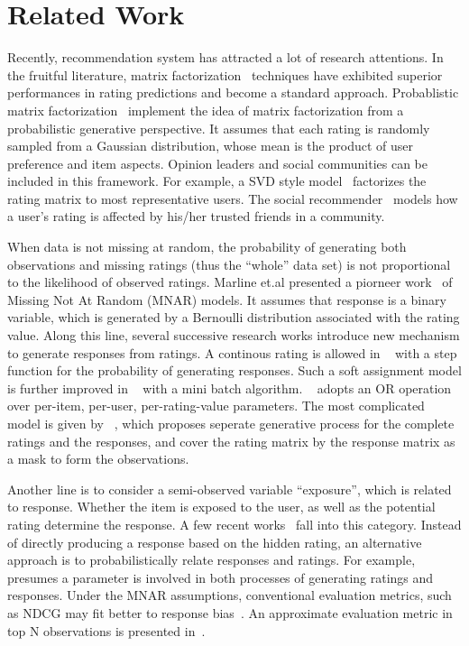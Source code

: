 \documentclass{sig-alternate}
\begin{document}
\section{Related Work}\label{sec:related}
Recently, recommendation system has attracted a lot of research attentions. In the fruitful literature, matrix factorization~\cite{Koren2009Matrix} techniques have exhibited superior performances in rating predictions and become a standard approach. Probablistic matrix factorization~\cite{salakhutdinov2008probabilistic} implement the idea of matrix factorization from a probabilistic generative perspective. It assumes that each rating is randomly sampled from a Gaussian distribution, whose mean is the product of user preference and item aspects. Opinion leaders and social communities can be included in this framework. For example, a SVD style model~\cite{Liu2011Wisdom} factorizes the rating matrix to most representative users. The social recommender~\cite{Jamali2011Generalized} models how a user's rating is affected by his/her trusted friends in a community.


When data is not missing at random, the probability of generating both observations and missing ratings (thus the ``whole'' data set) is not proportional to the likelihood of observed ratings. Marline et.al presented a piorneer work~\cite{Marlin2009Collaborative} of Missing Not At Random (MNAR) models. It assumes that response is a binary variable, which is generated by a Bernoulli distribution associated with the rating value. Along this line, several successive research works introduce new mechanism to generate responses from ratings. A continous rating is allowed in ~\cite{Ling2012Response} with a step function for the probability of generating responses. Such a soft assignment model is further improved in ~\cite{Yang2015Boosting} with a mini batch algorithm. ~\cite{Kim2014Bayesian} adopts an OR operation over per-item, per-user, per-rating-value parameters. The most complicated model is given by ~\cite{Hernandez-Lobato2014Probabilistic}, which proposes seperate generative process for the complete ratings and the responses, and cover the rating matrix by the response matrix as a mask to form the observations.

Another line is to consider a semi-observed variable ``exposure'', which is related to response. Whether the item is exposed to the user, as well as the potential rating determine the response. A few recent works~\cite{Liang2016Modeling,Gopalan2015Scalable} fall into this category. Instead of directly producing a response based on the hidden rating, an alternative approach is to probabilistically relate responses and ratings. For example, ~\cite{Ohsawa2016Gated} presumes a parameter is involved in both processes of generating ratings and responses. Under the MNAR assumptions, conventional evaluation metrics, such as NDCG may fit better to response bias~\cite{Pradel2012Ranking}. An approximate evaluation metric in top N observations is presented in~\cite{Steck2010Training}.
\end{document}
